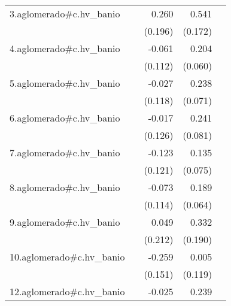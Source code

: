 {\begin{longtable}{l*{4}{D{.}{.}{-1}}}
\addlinespace
3.aglomerado#c.hv\_banio&                     &       0.260         &       0.541\sym{**} &                     \\
            &                     &     (0.196)         &     (0.172)         &                     \\
\addlinespace
4.aglomerado#c.hv\_banio&                     &      -0.061         &       0.204\sym{***}&                     \\
            &                     &     (0.112)         &     (0.060)         &                     \\
\addlinespace
5.aglomerado#c.hv\_banio&                     &      -0.027         &       0.238\sym{***}&                     \\
            &                     &     (0.118)         &     (0.071)         &                     \\
\addlinespace
6.aglomerado#c.hv\_banio&                     &      -0.017         &       0.241\sym{**} &                     \\
            &                     &     (0.126)         &     (0.081)         &                     \\
\addlinespace
7.aglomerado#c.hv\_banio&                     &      -0.123         &       0.135         &                     \\
            &                     &     (0.121)         &     (0.075)         &                     \\
\addlinespace
8.aglomerado#c.hv\_banio&                     &      -0.073         &       0.189\sym{**} &                     \\
            &                     &     (0.114)         &     (0.064)         &                     \\
\addlinespace
9.aglomerado#c.hv\_banio&                     &       0.049         &       0.332         &                     \\
            &                     &     (0.212)         &     (0.190)         &                     \\
\addlinespace
10.aglomerado#c.hv\_banio&                     &      -0.259         &       0.005         &                     \\
            &                     &     (0.151)         &     (0.119)         &                     \\
\addlinespace
12.aglomerado#c.hv\_banio&                     &      -0.025         &       0.239\sym{*}  &                     \\

\end{longtable}}
